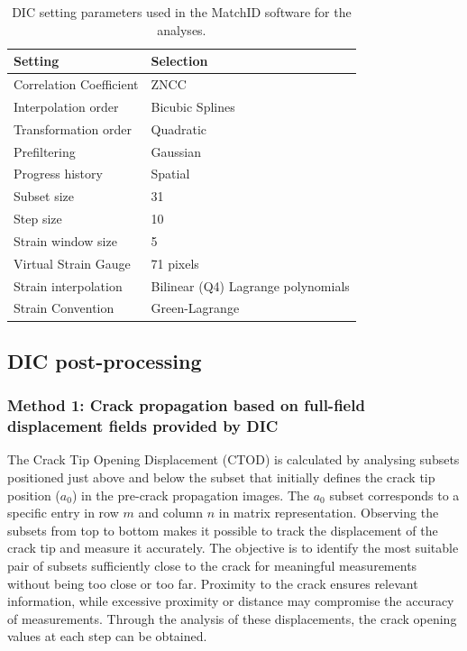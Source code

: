 \documentclass[3p,times,procedia]{elsarticle}
\begin{document}
\begin{table}[h]
	\centering
	\begin{tabular}{m{} m{}}
		\toprule
		\textbf{Setting} & \textbf{Selection} \\
		\midrule
		Correlation Coefficient & ZNCC \\
		Interpolation order & Bicubic Splines \\ 
		Transformation order & Quadratic \\
		Prefiltering & Gaussian \\
		Progress history & Spatial \\
		Subset size & 31 \\
		Step size & 10 \\
		Strain window size & 5 \\ 
		Virtual Strain Gauge & 71 pixels \\
		Strain interpolation & Bilinear (Q4) Lagrange polynomials \\
		Strain Convention & Green-Lagrange \\\bottomrule
	\end{tabular}
	\caption{DIC setting parameters used in the MatchID software for the analyses.}
	\label{tab:MatchID_param}
\end{table}

\subsection{DIC post-processing}

\subsubsection{Method 1: Crack propagation based on full-field displacement fields provided by DIC}

The Crack Tip Opening Displacement (CTOD) is calculated by analysing subsets positioned just above and below the subset that initially defines the crack tip position ($a_0$) in the pre-crack propagation images. The $a_0$ subset corresponds to a specific entry in row $m$ and column $n$ in matrix representation. Observing the subsets from top to bottom makes it possible to track the displacement of the crack tip and measure it accurately. The objective is to identify the most suitable pair of subsets sufficiently close to the crack for meaningful measurements without being too close or too far. Proximity to the crack ensures relevant information, while excessive proximity or distance may compromise the accuracy of measurements. Through the analysis of these displacements, the crack opening values at each step can be obtained.
\end{document}
